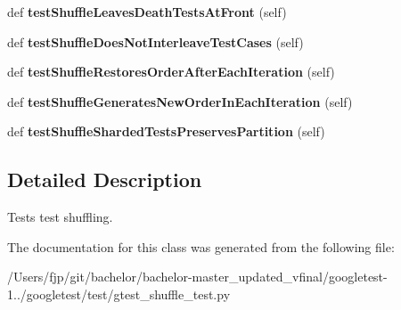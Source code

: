 \begin{DoxyCompactItemize}
def {\bfseries test\+Shuffle\+Leaves\+Death\+Tests\+At\+Front} (self)
\item 
\mbox{\label{classgtest__shuffle__test_1_1_g_test_shuffle_unit_test_a34bfc9696191f4c2782327e1e35ae902}} 
def {\bfseries test\+Shuffle\+Does\+Not\+Interleave\+Test\+Cases} (self)
\item 
\mbox{\label{classgtest__shuffle__test_1_1_g_test_shuffle_unit_test_a77b83a9870ad8d68524e1177f5320fb0}} 
def {\bfseries test\+Shuffle\+Restores\+Order\+After\+Each\+Iteration} (self)
\item 
\mbox{\label{classgtest__shuffle__test_1_1_g_test_shuffle_unit_test_ada78bae27e0d82d07bd663d53a36552b}} 
def {\bfseries test\+Shuffle\+Generates\+New\+Order\+In\+Each\+Iteration} (self)
\item 
\mbox{\label{classgtest__shuffle__test_1_1_g_test_shuffle_unit_test_abd33c5ef01ce6d1d025ebcc816d47c19}} 
def {\bfseries test\+Shuffle\+Sharded\+Tests\+Preserves\+Partition} (self)
\end{DoxyCompactItemize}


\subsection{Detailed Description}
\begin{DoxyVerb}Tests test shuffling.\end{DoxyVerb}
 

The documentation for this class was generated from the following file\+:\begin{DoxyCompactItemize}
\item 
/\+Users/fjp/git/bachelor/bachelor-\/master\+\_\+updated\+\_\+vfinal/googletest-\/1../googletest/test/gtest\+\_\+shuffle\+\_\+test.\+py\end{DoxyCompactItemize}
